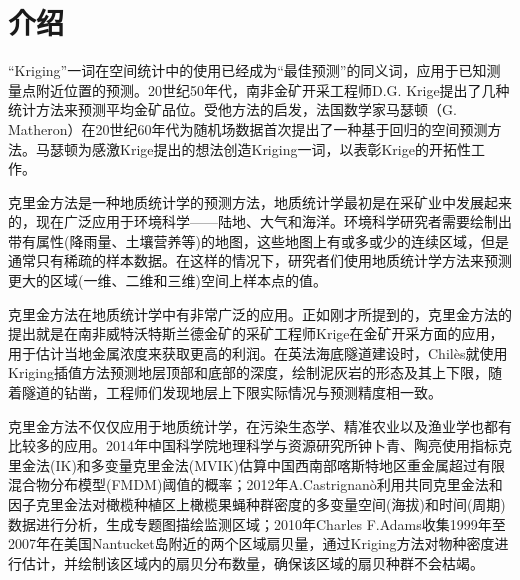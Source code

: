 \section{介绍}
“Kriging”一词在空间统计中的使用已经成为“最佳预测”的同义词\textsuperscript{\cite{cressie1990origins}}，应用于已知测量点附近位置的预测。20世纪50年代，南非金矿开采工程师D.G. Krige提出了几种统计方法来预测平均金矿品位。受他方法的启发，法国数学家马瑟顿（G. Matheron）在20世纪60年代为随机场数据首次提出了一种基于回归的空间预测方法。马瑟顿为感激Krige提出的想法创造Kriging一词，以表彰Krige的开拓性工作\textsuperscript{\cite{lovric2011international}}。

克里金方法是一种地质统计学的预测方法，地质统计学最初是在采矿业中发展起来的，现在广泛应用于环境科学——陆地、大气和海洋\textsuperscript{\cite{oliver2015basic}}。环境科学研究者需要绘制出带有属性(降雨量、土壤营养等)的地图，这些地图上有或多或少的连续区域，但是通常只有稀疏的样本数据。在这样的情况下，研究者们使用地质统计学方法来预测更大的区域(一维、二维和三维)空间上样本点的值。

克里金方法在地质统计学中有非常广泛的应用。正如刚才所提到的，克里金方法的提出就是在南非威特沃特斯兰德金矿的采矿工程师Krige在金矿开采方面的应用，用于估计当地金属浓度来获取更高的利润。在英法海底隧道建设时，Chilès就使用Kriging插值方法预测地层顶部和底部的深度，绘制泥灰岩的形态及其上下限，随着隧道的钻凿，工程师们发现地层上下限实际情况与预测精度相一致\textsuperscript{\cite{chiles2009geostatistics}}。

克里金方法不仅仅应用于地质统计学，在污染生态学、精准农业以及渔业学也都有比较多的应用。2014年中国科学院地理科学与资源研究所钟卜青、陶亮使用指标克里金法(IK)和多变量克里金法(MVIK)估算中国西南部喀斯特地区重金属超过有限混合物分布模型(FMDM)阈值的概率\textsuperscript{\cite{ZHONG2014422}}；2012年A.Castrignanò利用共同克里金法和因子克里金法对橄榄种植区上橄榄果蝇种群密度的多变量空间(海拔)和时间(周期)数据进行分析，生成专题图描绘监测区域\textsuperscript{\cite{castrignano2012spatio}}；2010年Charles F.Adams收集1999年至2007年在美国Nantucket岛附近的两个区域扇贝量，通过Kriging方法对物种密度进行估计，并绘制该区域内的扇贝分布数量，确保该区域的扇贝种群不会枯竭\textsuperscript{\cite{ADAMS2010460}}。